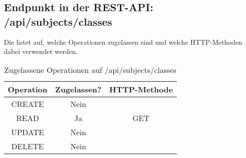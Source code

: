 \subsection{Endpunkt in der REST-API: /api/subjects/classes}
Die  listet auf, welche Operationen zugelassen sind und welche HTTP-Methoden dabei verwendet werden. 

\begin{table}[!htbp]
	\begin{tabular}{|c|c|c|}
		\hline
			\textbf{Operation} & \textbf{Zugelassen?} & \textbf{HTTP-Methode} \\ \hline
			CREATE & Nein & \\ \hline 
			READ & Ja & GET \\ \hline
			UPDATE & Nein & \\ \hline 
			DELETE & Nein & \\ \hline
	\end{tabular}

		\caption{Zugelassene Operationen auf /api/subjects/classes}
		\label{tab:end:rest:api:subjects:classes:meth}
\end{table}

%